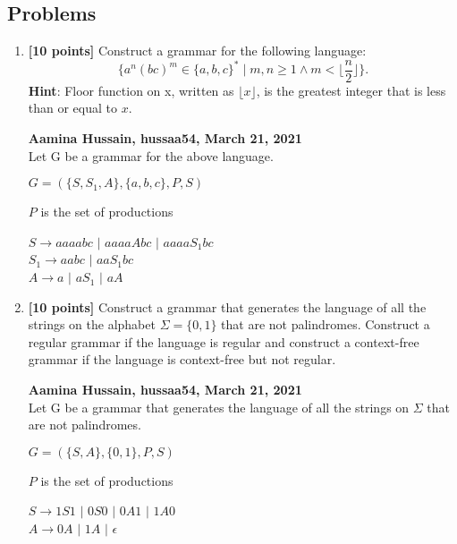 \documentclass[11pt,fleqn]{article}
\newcommand{\be}{\begin{enumerate}}
\newcommand{\ee}{\end{enumerate}}
\begin{document}
\newpage

\subsection*{Problems}

\be

  \item \textbf{[10 points]} Construct a grammar for the following
    language: $$\Big\{a^n(bc)^m \in \{a,b,c\}^* \mid m,n \ge 1 \wedge
    m < \lfloor\frac{n}{2}\rfloor\Big\}.$$
	\textbf{Hint}: Floor function on x, written as $\lfloor x\rfloor$, is the greatest integer that is less than or equal to $x$.
	

  \bigskip

  \textbf{Aamina Hussain, hussaa54, March 21, 2021}\\
  Let G be a grammar for the above language.

  $G = (\{S, S_1, A\}, \{a, b, c\}, P, S)$

  $P$ is the set of productions

  $S \rightarrow aaaabc$ $|$ $aaaaAbc$ $|$ $aaaaS_1bc$\\
  $S_1 \rightarrow aabc$ $|$ $aaS_1bc$\\
  $A \rightarrow a$ $|$ $aS_1$ $|$ $aA$\\

  \bigskip

  \item \textbf{[10 points]} Construct a grammar that generates the
    language of all the strings on the alphabet $\Sigma = \{0,1\}$
    that are not palindromes.  Construct a regular grammar if the
    language is regular and construct a context-free grammar if the
    language is context-free but not regular.
  


  \bigskip

  \textbf{Aamina Hussain, hussaa54, March 21, 2021}\\
  Let G be a grammar that generates the language of all the strings on $\Sigma$ that are not palindromes.

  $G = (\{S, A\}, \{0, 1\}, P, S)$

  $P$ is the set of productions

  $S \rightarrow 1S1$ $|$ $0S0$ $|$ $0A1$ $|$ $1A0$\\
  $A \rightarrow 0A$ $|$ $1A$ $|$ $\epsilon$\\

\ee
\end{document}
